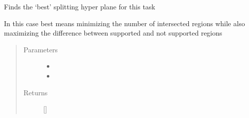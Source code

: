 \documentclass[letterpaper,10pt,english]{sphinxmanual}
\begin{document}
\begin{fulllineitems}
\label{\detokenize{mpo.upop:mpo.upop.ucontroller.determine_hyperplane}}
\sphinxAtStartPar
Finds the ‘best’ splitting hyper plane for this task

\sphinxAtStartPar
In this case best means minimizing the number of intersected regions while also maximizing the difference between supported and not supported regions
\begin{quote}\begin{description}
\item[{Parameters}] \leavevmode\begin{itemize}
\item {} 
\sphinxAtStartPar
{} \textendash{} 

\item {} 
\sphinxAtStartPar
{} \textendash{} 

\end{itemize}

\item[{Returns}] \leavevmode
\sphinxAtStartPar
{[}{]}

\end{description}\end{quote}

\end{fulllineitems}

\end{document}
